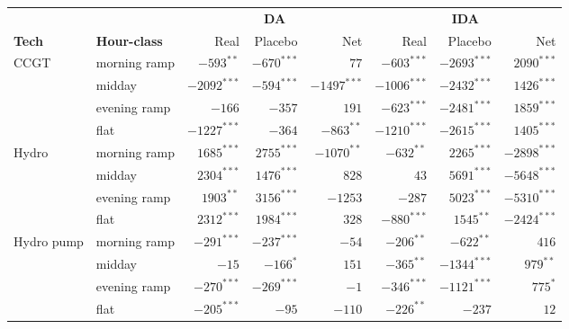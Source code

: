 \documentclass[11pt]{article}
\begin{document}
\begin{center}
\footnotesize
\setlength{\tabcolsep}{4pt}
\begin{tabular}{l l r r r r r r}
\toprule
                & & \multicolumn{3}{c}{\textbf{DA}} & \multicolumn{3}{c}{\textbf{IDA}} \\
\cmidrule(lr){3-5} \cmidrule(lr){6-8}
\textbf{Tech} & \textbf{Hour-class} & Real & Placebo & Net & Real & Placebo & Net \\
\midrule
CCGT        & morning ramp  & $-593^{**}$    & $-670^{***}$   & $77$           & $-603^{***}$   & $-2693^{***}$  & $2090^{***}$ \\
            & midday        & $-2092^{***}$  & $-594^{***}$   & $-1497^{***}$  & $-1006^{***}$  & $-2432^{***}$  & $1426^{***}$ \\
            & evening ramp  & $-166$         & $-357$         & $191$          & $-623^{***}$   & $-2481^{***}$  & $1859^{***}$ \\
            & flat          & $-1227^{***}$  & $-364$         & $-863^{**}$    & $-1210^{***}$  & $-2615^{***}$  & $1405^{***}$ \\
\addlinespace
Hydro       & morning ramp  & $1685^{***}$   & $2755^{***}$   & $-1070^{**}$   & $-632^{**}$    & $2265^{***}$   & $-2898^{***}$ \\
            & midday        & $2304^{***}$   & $1476^{***}$   & $828$          & $43$           & $5691^{***}$   & $-5648^{***}$ \\
            & evening ramp  & $1903^{**}$    & $3156^{***}$   & $-1253$        & $-287$         & $5023^{***}$   & $-5310^{***}$ \\
            & flat          & $2312^{***}$   & $1984^{***}$   & $328$          & $-880^{***}$   & $1545^{**}$    & $-2424^{***}$ \\
\addlinespace
Hydro pump  & morning ramp  & $-291^{***}$   & $-237^{***}$   & $-54$          & $-206^{**}$    & $-622^{**}$    & $416$ \\
            & midday        & $-15$          & $-166^{*}$     & $151$          & $-365^{**}$    & $-1344^{***}$  & $979^{**}$ \\
            & evening ramp  & $-270^{***}$   & $-269^{***}$   & $-1$           & $-346^{***}$   & $-1121^{***}$  & $775^{*}$ \\
            & flat          & $-205^{***}$   & $-95$          & $-110$         & $-226^{**}$    & $-237$         & $12$ \\
\bottomrule
\end{tabular}
\label{tab:specB-id15}
\end{center}
\end{document}
